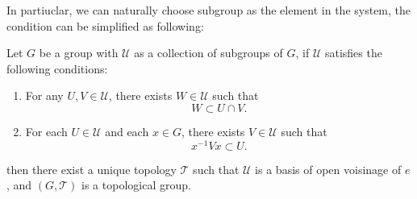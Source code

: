 In partiuclar, we can naturally choose subgroup as the element in the system, the condition can be simplified as following:
\begin{corollary}
    Let \(G\) be a group with \( \mathcal{U}\) as a collection of subgroups of \(G\), if \( \mathcal{U}\) satisfies the following conditions:
    \begin{enumerate}
    \item For any $U,V\in\mathcal{U}$, there exists $W\in\mathcal{U}$ such that 
    \[
    W \subset U\cap V.
    \]

    \item For each $U\in\mathcal{U}$ and each $x\in G$, there exists $V\in\mathcal{U}$ such that 
    \[
    x^{-1} V x \subset U.
    \]
\end{enumerate}
then there exist a unique topology \(\mathcal{T}\) such that \(\mathcal{U}\) is a basis of open voisinage of \(e\), and \((G,\mathcal{T})\) is a topological group.
\end{corollary} 

